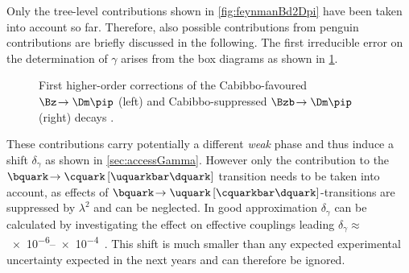 Only the tree-level contributions shown in \cref{fig:feynmanBd2Dpi} have been taken into account so far.
Therefore, also possible contributions from penguin contributions are briefly discussed in the following.
The first irreducible error on the determination of $\gamma$ arises from the box diagrams as shown in \cref{fig:feynmanBd2DpiPenguin}.
\begin{figure}[tbp]
	\centering
	
	
	\caption{First higher-order corrections of the Cabibbo-favoured $\Bz\!\to\Dm\pip$ (left) and Cabibbo-suppressed $\Bzb\!\to\Dm\pip$ (right) decays \cite{Ellis:2016jkw}.}
	\label{fig:feynmanBd2DpiPenguin}
\end{figure}
These contributions carry potentially a different \emph{weak} phase and thus induce a shift $\delta_\gamma$ as shown in \cref{sec:accessGamma}.
However only the contribution to the $\bquark\!\to\cquark\left[\uquarkbar\dquark\right]$ transition needs to be taken into account, as effects of $\bquark\!\to\uquark\left[\cquarkbar\dquark\right]$-transitions are suppressed by $\lambda^2$ and can be neglected.
In good approximation $\delta_\gamma$ can be calculated by investigating the effect on effective couplings leading $\delta_\gamma\approx\,$\numrange{e-6}{e-4}~\cite{Brod:2014qwa}.
This shift is much smaller than any expected experimental uncertainty expected in the next years and can therefore be ignored.

